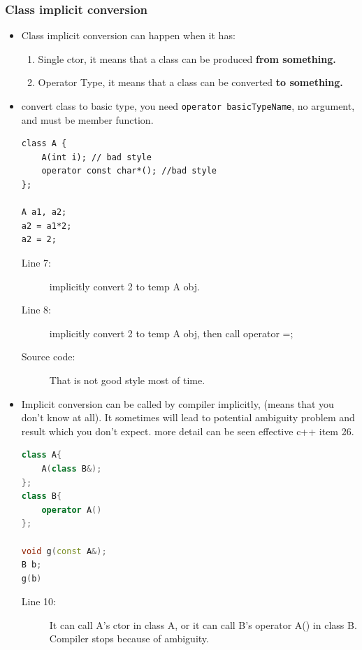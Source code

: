 \documentclass[a4paper,11pt,twoside]{book}
\begin{document}
\subsubsection{Class implicit conversion}
\begin{itemize}
	
	\item Class implicit conversion can happen when it has:
	\begin{enumerate}
		\item Single ctor, it means that a class can be produced \textbf{from something.}
		\item Operator Type, it means that a class can be converted \textbf{to something.}
	\end{enumerate}
	
	\item  convert class to basic type, you need \texttt{operator basicTypeName}, no argument, and must be member function.

\begin{lstlisting}
class A {
	A(int i); // bad style
	operator const char*(); //bad style
};
	
A a1, a2;
a2 = a1*2;  
a2 = 2;
\end{lstlisting}
\begin{description}
	\item[Line 7:] implicitly convert 2 to temp A obj.
	\item[Line 8:] implicitly convert 2 to temp A obj, then call operator =;
	\item[Source code:] That is not good style most of time.
\end{description}
	
	\item Implicit conversion can be called by compiler implicitly, (means that you don't know at all). It sometimes will lead to potential ambiguity problem and result which you don't expect. more detail can be seen effective c++ item 26.
\begin{lstlisting}[frame=single, language=c++]
class A{
	A(class B&);
};
class B{
	operator A()
};
	
void g(const A&);
B b;
g(b)
\end{lstlisting}
\begin{description}
	\item[Line 10:]	It can call A's ctor in class A, or it can call B's operator A() in class B. Compiler stops because of ambiguity.
\end{description}	
	

\end{itemize}
\end{document}
